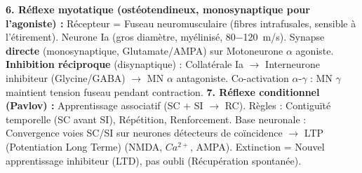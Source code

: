 \documentclass[11pt]{article}
\newcommand{\cle}[1]{{\popxbold\color{popdark}#1}}
\begin{document}
\begin{aretenir}
\textbf{6. Réflexe myotatique (ostéotendineux, monosynaptique pour l'agoniste) :} Récepteur = \cle{Fuseau neuromusculaire} (fibres intrafusales, sensible à l'étirement). Neurone Ia (gros diamètre, myélinisé, \SI{80-120}{m/s}). Synapse \textbf{directe} (monosynaptique, Glutamate/AMPA) sur Motoneurone $\alpha$ agoniste. \textbf{Inhibition réciproque} (disynaptique) : Collatérale Ia $\rightarrow$ Interneurone inhibiteur (Glycine/GABA) $\rightarrow$ MN $\alpha$ antagoniste. \cle{Co-activation $\alpha$-$\gamma$} : MN $\gamma$ maintient tension fuseau pendant contraction.
\textbf{7. Réflexe conditionnel (Pavlov) :} Apprentissage associatif (SC + SI $\rightarrow$ RC). Règles : Contiguïté temporelle (SC avant SI), Répétition, Renforcement. Base neuronale : \cle{Convergence} voies SC/SI sur neurones détecteurs de coïncidence $\rightarrow$ \cle{LTP (Potentiation Long Terme)} (NMDA, $Ca^{2+}$, AMPA). Extinction = Nouvel apprentissage inhibiteur (LTD), pas oubli (Récupération spontanée).
\end{aretenir}
\end{document}
